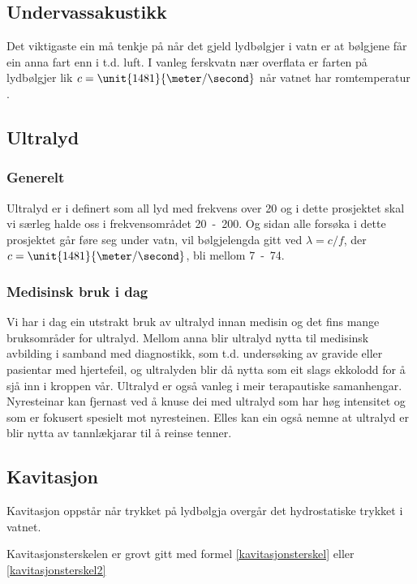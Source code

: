 \subsection{Undervassakustikk}
Det viktigaste ein må tenkje på når det gjeld lydbølgjer i vatn er at bølgjene får ein anna fart enn i t.d. luft. I vanleg ferskvatn nær overflata er farten på lydbølgjer lik $c = \unit{1481}{\meter / \second}$ når vatnet har romtemperatur \cite[s. 630]{citeulike:4412590}.
\subsection{Ultralyd}
\subsubsection*{Generelt}
Ultralyd er i \cite[s. 443]{citeulike:4412590} definert som all lyd med frekvens over \unit{20}{\kilo \hertz} og i dette prosjektet skal vi særleg halde oss i frekvensområdet \unit{20 - 200}{\kilo \hertz}. Og sidan alle forsøka i dette prosjektet går føre seg under vatn, vil bølgjelengda gitt ved $\lambda = c / f$, der $c = \unit{1481}{\meter / \second}$, bli mellom \unit{7 - 74}{\milli\meter}.

\subsubsection*{Medisinsk bruk i dag}
Vi har i dag ein utstrakt bruk av ultralyd innan medisin og det fins mange bruksområder for ultralyd. Mellom anna blir ultralyd nytta til medisinsk avbilding i samband med diagnostikk, som t.d. undersøking av gravide eller pasientar med hjertefeil, og ultralyden blir då nytta som eit slags ekkolodd for å sjå inn i kroppen vår. Ultralyd er også vanleg i meir terapautiske samanhengar. Nyresteinar kan fjernast ved å knuse dei med ultralyd som har høg intensitet og som er fokusert spesielt mot nyresteinen. Elles kan ein også nemne at ultralyd er blir nytta av tannlækjarar til å reinse tenner.

\subsection{Kavitasjon}
Kavitasjon oppstår når trykket på lydbølgja overgår det hydrostatiske trykket i vatnet.\cite{Kinsler:2000rc}

Kavitasjonsterskelen er grovt gitt\cite{kavitasjon} med formel \eqref{kavitasjonsterskel} eller \eqref{kavitasjonsterskel2}


